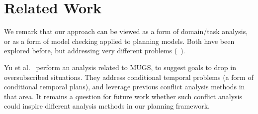 \section{Related Work}
\label{related}



%
We remark that our approach can be viewed as a form of domain/task
analysis, or as a form of model checking applied to planning
models. Both have been explored before, but addressing very different
problems
(\eg\ \cite{fox:long:jair-98,rintanen:aaai-00,vaquero:etal:keq-13}).

Yu et al.\  perform an analysis related to
MUGS, to suggest goals to drop in oversubscribed situations. They
address conditional temporal problems (a form of conditional temporal
plans), and leverage previous conflict analysis methods in that
area. It remains a question for future work whether such conflict
analysis could inspire different analysis methods in our planning
framework.






